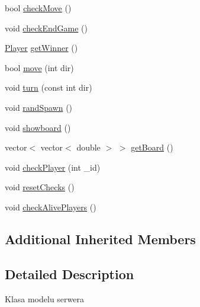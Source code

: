 \begin{DoxyCompactItemize}
bool \hyperlink{classServerModel_acb1a12dd3af4d4ae84ce6a76742bc5b0}{check\-Move} ()
\item 
void \hyperlink{classServerModel_a0f9e52d858f03acff61df4ec297fbc87}{check\-End\-Game} ()
\item 
\hyperlink{classPlayer}{Player} \hyperlink{classServerModel_a7b23bfe191a3f618f260c781e5306e57}{get\-Winner} ()
\item 
bool \hyperlink{classServerModel_a2ed41cae52af16d5410b0669cce5fc7a}{move} (int dir)
\item 
void \hyperlink{classServerModel_a84fbe35ac950f1b71da800e14ac85814}{turn} (const int dir)
\item 
void \hyperlink{classServerModel_a30ce9865dba626f3aca22e6355d45a79}{rand\-Spawn} ()
\item 
void \hyperlink{classServerModel_a8f187ffda03256f2aa2679b22399d8ed}{showboard} ()
\item 
vector$<$ vector$<$ double $>$ $>$ \hyperlink{classServerModel_a0cdcac1cfe266b4fdaf9b0251a6f6553}{get\-Board} ()
\item 
void \hyperlink{classServerModel_a155230e9bb8373cfe4eaedbb87b05c0c}{check\-Player} (int \-\_\-id)
\item 
void \hyperlink{classServerModel_a402b44d30f2b3207154a67db4c28982f}{reset\-Checks} ()
\item 
void \hyperlink{classServerModel_aedccd8017caa1e8a9ed5a323d19d424e}{check\-Alive\-Players} ()
\end{DoxyCompactItemize}
\subsection*{Additional Inherited Members}


\subsection{Detailed Description}
Klasa modelu serwera 

